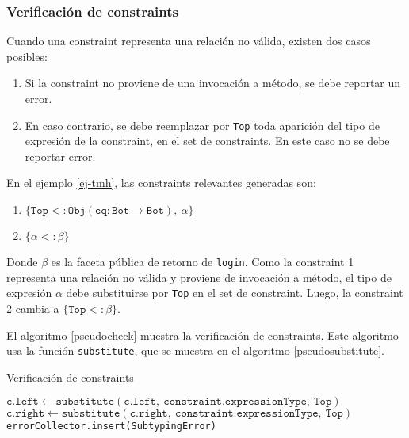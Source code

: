 \subsubsection{Verificación de constraints} \label{propuestaVer}
Cuando una constraint representa una relación no válida, existen dos casos posibles:

\begin{enumerate}
  \item Si la constraint no proviene de una invocación a método, se debe reportar un error.
  \item En caso contrario, se debe reemplazar por \texttt{Top} toda aparición del tipo de expresión de la constraint, en el set de constraints. En este caso no se debe reportar error.
\end{enumerate}

En el ejemplo \ref{ej-tmh}, las constraints relevantes generadas son:

\begin{enumerate}
  \item $\{\mathtt{Top <: Obj(eq: Bot \rightarrow Bot),\ \alpha}\}$
  \item $\{\mathtt{\alpha <: \beta}\}$
\end{enumerate}

Donde $\beta$ es la faceta pública de retorno de \texttt{login}. Como la constraint 1 representa una relación no válida y proviene de invocación a método, el tipo de expresión $\alpha$ debe substituirse por \texttt{Top} en el set de constraint. Luego, la constraint 2 cambia a $\{\mathtt{Top <: \beta}\}$.

El algoritmo \ref{pseudocheck} muestra la verificación de constraints. Este algoritmo usa la función \texttt{substitute}, que se muestra en el algoritmo \ref{pseudosubstitute}.

\begin{algorithm}\captionsetup{labelsep=newline}
  \centering
  \caption{Verificación de constraints}
  \label{pseudocheck}
    \begin{algorithmic}[1]
                \State $\mathtt{c.left\gets substitute(c.left,\ constraint.expressionType,\ Top)}$
                \State $\mathtt{c.right\gets substitute(c.right,\ constraint.expressionType,\ Top)}$
              \EndFor
              \State \texttt{errorCollector.insert(SubtypingError)}
            \EndIf
          \EndFor
      \EndFunction
    \end{algorithmic}
\end{algorithm}

